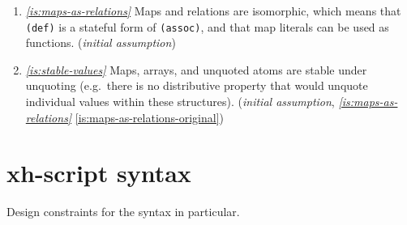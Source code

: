 \documentclass{report}
\makeatletter
\newcommand*{\Label}[2]{%
  \@bsphack
  \begingroup
    \label{#1-original}%
    \def\@currentlabel{#2}%
    \label{#1}%
  \endgroup
  \@esphack
}
\newcommand{\initial}{{\em initial assumption}}
\newcommand{\refboth}[1]{{\em \ref{#1}} \ref{#1-original}}
\makeatother
\begin{document}
\begin{enumerate}
\item{}\Label{is:maps-as-relations}{xhs.mapsasrelations}{\em\ref{is:maps-as-relations}}
  Maps and relations are isomorphic, which means that \verb|(def)| is a
  stateful form of \verb|(assoc)|, and that map literals can be used as
  functions.
(\initial)
\item{}\Label{is:stable-values}{xhs.stablevalues}{\em\ref{is:stable-values}}
  Maps, arrays, and unquoted atoms are stable under unquoting (e.g.~there
  is no distributive property that would unquote individual values within
  these structures).
(\initial, \refboth{is:maps-as-relations})
\end{enumerate}

\chapter{xh-script syntax}\label{chp:xhs-syntax}
  Design constraints for the syntax in particular.
\end{document}

